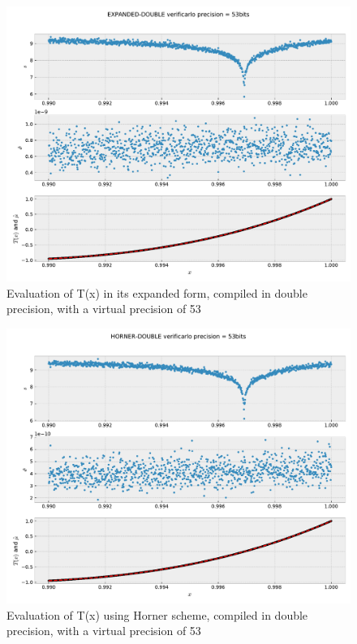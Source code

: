 \documentclass{TP}
\begin{document}
\begin{figure}[h]
  \center \includegraphics[width=.8\textwidth]{EXPANDED-DOUBLE-53-zoom.pdf}
  \caption{Evaluation of T(x) in its expanded form, compiled in double
    precision, with a virtual precision of 53}
  \label{fig:expanded:double:53:zoom}
\end{figure}

\begin{figure}[h]
  \center \includegraphics[width=.8\textwidth]{HORNER-DOUBLE-53-zoom.pdf}
  \caption{Evaluation of T(x) using Horner scheme, compiled in double precision,
    with a virtual precision of 53}
  \label{fig:horner:double:53:zoom}
\end{figure}
\end{document}
